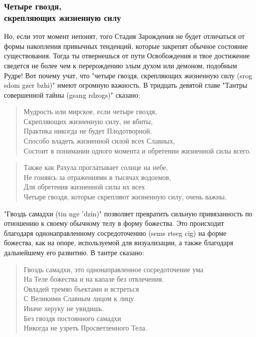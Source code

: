 \subsubsection{Четыре гвоздя, \\скрепляющих жизненную силу}
Но, если этот момент непонят, того Стадия Зарождения не будет отличаться от
формы накопления привычных тенденций, которые закрепят обычное состояние
существования. Тогда ты отвернешься от пути Освобождения и твое достижение сведется не
более чем к перерождению злым духом или демоном, подобным Рудре! Вот почему учат, что
"четыре гвоздя, скрепляющих жизненную силу (srog sdom gzer bzhi)" имеют огромную
важность. В тридцать девятой главе "Тантры совершенной тайны (gsang rdzogs)" сказано:

\begin{verse}
Мудрость или мирское, если четыре гвоздя,\\
Скрепляющих жизненную силу, не вбиты,\\
Практика никогда не будет Плодотворной.\\
Способо владеть жизненной силой всех Славных,\\
Состоит в понимании одного момента и обретении жизненной силы всего.\\
\end{verse}

\begin{verse}
Также как Рахула проглатывает солнце на небе,\\
Не гоняясь за отражениями в тысячах водоемов,\\
Для обретения жизненной силы их всех\\
Четыре гвоздя, которые скрепляют жизненную силу, очень важны.
\end{verse}

"Гвоздь самадхи (tin nge 'dzin)" позволяет превратить сильную привязанность по
отношению к своему обычному телу в форму божества. Это происходит благодаря
однонаправленному сосредоточению (sems rtseg cig) на форме божества, как на опоре,
используемой для визуализации, а также благодаря дальнейшему его развитию. В тантре
сказано:

\begin{verse}
Гвоздь самадхи, это однонаправленное сосредоточение ума\\
На Теле божества и на капале без отвлечения.\\
Овладей тремяо бъектами и встреться\\
С Великими Славным лицом к лицу.\\
Иначе херуку не увидишь.\\
Без гвоздя постоянного самадхи\\
Никогда не узреть Просветленного Тела.
\end{verse}

